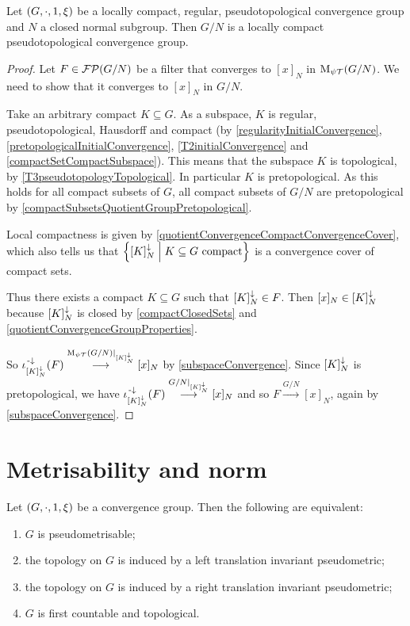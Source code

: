 \begin{proposition}
Let $\left( G, \cdot, 1, \xi \right)$ be a locally compact, regular, pseudotopological convergence group and $N$ a closed normal subgroup. Then $G/N$ is a locally compact pseudotopological convergence group.
\end{proposition}
\begin{proof}
Let $F\in \operatorname{\mathcal{FP}}(G/N)$ be a filter that converges to $[x]_N$ in $\operatorname{M_{\psi\mathcal{T}}}(G/N)$. We need to show that it converges to $[x]_N$ in $G/N$.

Take an arbitrary compact $K\subseteq G$. As a subspace, $K$ is regular, pseudotopological, Hausdorff and compact (by \ref{regularityInitialConvergence}, \ref{pretopologicalInitialConvergence}, \ref{T2initialConvergence} and \ref{compactSetCompactSubspace}). This means that the subspace $K$ is topological, by \ref{T3pseudotopologyTopological}. In particular $K$ is pretopological. As this holds for all compact subsets of $G$, all compact subsets of $G/N$ are pretopological by \ref{compactSubsetsQuotientGroupPretopological}.

Local compactness is given by \ref{quotientConvergenceCompactConvergenceCover}, which also tells us that $\setbuilder{[K]^\imf_N}{\text{$K\subseteq G$ compact}}$ is a convergence cover of compact sets.

Thus there exists a compact $K\subseteq G$ such that $[K]^\downarrow_N\in F$. Then $[x]_N\in [K]^\downarrow_N$ because $[K]^\downarrow_N$ is closed by \ref{compactClosedSets} and \ref{quotientConvergenceGroupProperties}.

So $\iota_{[K]^\downarrow_N}^{\text{\hspace{0.15em}-}\downarrow}(F) \overset{\operatorname{M_{\psi\mathcal{T}}}(G/N)|_{[K]^\downarrow_N}}{\longrightarrow} [x]_N$ by \ref{subspaceConvergence}. Since $[K]^\downarrow_N$ is pretopological, we have $\iota_{[K]^\downarrow_N}^{\text{\hspace{0.15em}-}\downarrow}(F) \overset{G/N|_{[K]^\downarrow_N}}{\longrightarrow} [x]_N$ and so $F \overset{G/N}{\longrightarrow} [x]_N$, again by \ref{subspaceConvergence}.
\end{proof}

\section{Metrisability and norm}

\begin{theorem}
Let $\left( G,\cdot, 1, \xi \right)$ be a convergence group. Then the following are equivalent:
\begin{enumerate}
\item $G$ is pseudometrisable;
\item the topology on $G$ is induced by a left translation invariant pseudometric;
\item the topology on $G$ is induced by a right translation invariant pseudometric;
\item $G$ is first countable and topological.
\end{enumerate}
\end{theorem}


